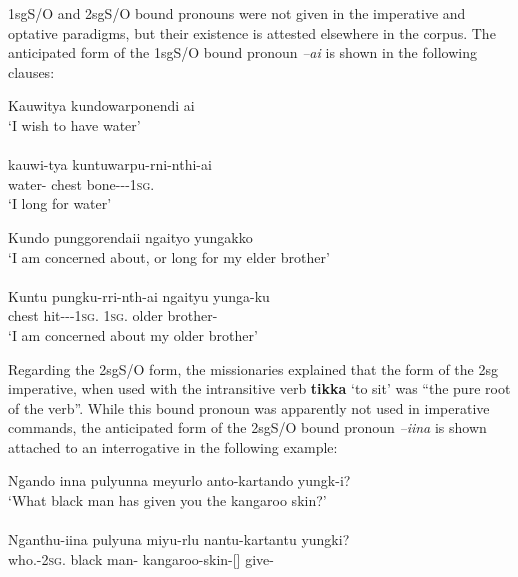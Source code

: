 1sgS/O and 2sgS/O bound pronouns were not given in the imperative and optative paradigms, but their existence is attested elsewhere in the corpus. The anticipated form of the 1sgS/O bound pronoun \textit{–ai} is shown in the following clauses:

\ea\label{ex:5:21}
Kauwitya        kundowarponendi ai \\
\glt `I wish to have water' \\
\citep{teichelmann_outlines_1840} \\
\gll kauwi-tya       kuntuwarpu-rni-nthi-ai \\
water-    {chest bone---1\textsc{sg}.\footnotemark}                               \\
\glt `I long for water'
\z


\ea\label{ex:5:22}
 Kundo       punggorendaii   	 ngaityo 		yungakko \\
\glt     	`I am concerned about, or long for my elder brother' \\
\citep{teichelmann_dictionary_1857} \\
\gll Kuntu	  pungku-rri-nth-ai   	  ngaityu		 yunga-ku \\
    chest	  hit---1\textsc{sg}.   1\textsc{sg}.             {older brother-}	\\
\glt `I am concerned about my older brother'
\z


Regarding the 2sgS/O form, the missionaries \citep[17]{teichelmann_outlines_1840} explained that the form of the 2sg imperative, when used with the intransitive verb \textbf{tikka} `to sit' was “the pure root of the verb”. While this bound pronoun was apparently not used in imperative commands, the anticipated form of the 2sgS/O bound pronoun \textit{–iina} is shown attached to an interrogative in the following example:

\ea\label{ex:5:23}
Ngando inna 		pulyunna    meyurlo	 anto-kartando 		yungk-i?  \\
\glt     `What black man has given you the kangaroo skin?' \\
\citep[68]{teichelmann_outlines_1840} \\
\gll Nganthu-iina                    pulyuna    miyu-rlu  	nantu-kartantu		yungki? \\
who.-2\textsc{sg}.          black        man-  kangaroo-skin-[]       give-\\
\z


